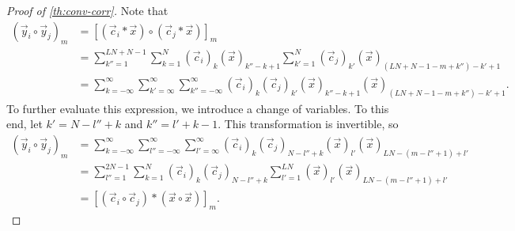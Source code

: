 \documentclass[a4paper, openany, oneside]{memoir}
\begin{document}
\begin{proof}[Proof of \cref{th:conv-corr}]
    Note that
    \begin{align*}
        (\vec{y}_i \circ \vec{y}_j)_m
        &= [(\vec{c}_i \ast \vec{x}) \circ (\vec{c}_j \ast \vec{x})]_m \\
        &=\sum_{k''=1}^{LN+N-1}\sum_{k=1}^N (\vec{c}_i)_k (\vec{x})_{k''-k+1}\sum_{k'=1}^{N}(\vec{c}_j)_{k'}(\vec{x})_{(LN+N-1-m+k'')-k'+1} \\
        &=\sum_{k=-\infty}^\infty\sum_{k'=\infty}^{\infty}\sum_{k''=-\infty}^{\infty} (\vec{c}_i)_k (\vec{c}_j)_{k'}(\vec{x})_{k''-k+1}(\vec{x})_{(LN+N-1-m+k'')-k'+1}.
    \end{align*}
    To further evaluate this expression, we introduce a change of variables. To this end, let $k' = N -l'' +k$ and $k'' = l' + k - 1$. This transformation is invertible, so
    \begin{align*}
        (\vec{y}_i \circ \vec{y}_j)_m
        &=\sum_{k=-\infty}^\infty\sum_{l''=-\infty}^{\infty}\sum_{l'=\infty}^{\infty} (\vec{c}_i)_k (\vec{c}_j)_{N -l'' +k}(\vec{x})_{l'}
        (\vec{x})_{LN-(m-l'' + 1)+l'} \\
        &=\sum_{l''=1}^{2N-1}\sum_{k=1}^{N}(\vec{c}_i)_k (\vec{c}_j)_{N -l'' +k}\sum_{l'=1}^{LN}(\vec{x})_{l'}
        (\vec{x})_{LN-(m-l'' + 1)+l'} \\
        &=[(\vec{c}_i \circ \vec{c}_j) \ast (\vec{x} \circ \vec{x})]_m.
    \end{align*}
\end{proof}
\end{document}
